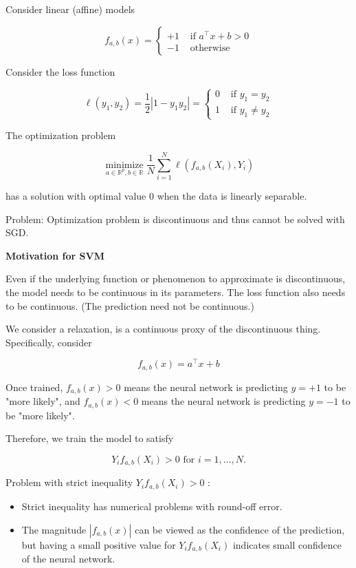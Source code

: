 \begin{frame}[allowframebreaks]

Consider linear (affine) models

$$
f_{a, b}(x)= \begin{cases}+1 & \text { if } a^{\top} x+b>0 \\ -1 & \text { otherwise }\end{cases}
$$

Consider the loss function

$$
\ell\left(y_{1}, y_{2}\right)=\frac{1}{2}\left|1-y_{1} y_{2}\right|= \begin{cases}0 & \text { if } y_{1}=y_{2} \\ 1 & \text { if } y_{1} \neq y_{2}\end{cases}
$$

The optimization problem

$$
\underset{a \in \mathbb{R}^{p}, b \in \mathbb{R}}{\operatorname{minimize}} \frac{1}{N} \sum_{i=1}^{N} \ell\left(f_{a, b}\left(X_{i}\right), Y_{i}\right)
$$

has a solution with optimal value 0 when the data is linearly separable.

Problem: Optimization problem is discontinuous and thus cannot be solved with SGD.

\par\noindent\textcolor{gray}{\hdashrule{\textwidth}{0.4pt}{1pt 2pt}}

\textbf{Motivation for SVM}

Even if the underlying function or phenomenon to approximate is discontinuous, the model needs to be continuous in its parameters. The loss function also needs to be continuous. (The prediction need not be continuous.)

We consider a relaxation, is a continuous proxy of the discontinuous thing. Specifically, consider

$$
f_{a, b}(x)=a^{\top} x+b
$$

Once trained, $f_{a, b}(x)>0$ means the neural network is predicting $y=+1$ to be "more likely", and $f_{a, b}(x)<0$ means the neural network is predicting $y=-1$ to be "more likely".

Therefore, we train the model to satisfy

$$
Y_{i} f_{a, b}\left(X_{i}\right)>0 \text { for } i=1, \ldots, N .
$$

Problem with strict inequality $Y_{i} f_{a, b}\left(X_{i}\right)>0$ :

\begin{itemize}
    \item Strict inequality has numerical problems with round-off error.
    \item The magnitude $\left|f_{a, b}(x)\right|$ can be viewed as the confidence of the prediction, but having a small positive value for $Y_{i} f_{a, b}\left(X_{i}\right)$ indicates small confidence of the neural network.
\end{itemize}


\end{frame}
